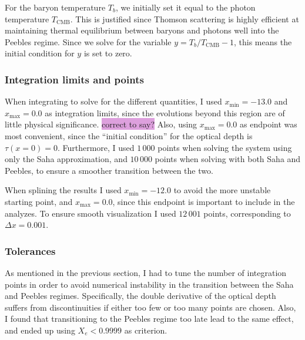 \documentclass{aa}
\numberwithin{equation}{section}
\numberwithin{table}{section}
\numberwithin{figure}{section}
\begin{document}
For the baryon temperature $T_b$, we initially set it equal to the photon temperature $T_\text{CMB}$. This is justified since Thomson scattering is highly efficient at maintaining thermal equilibrium between baryons and photons well into the Peebles regime. Since we solve for the variable $y = T_b / T_\text{CMB} - 1$, this means the initial condition for $y$ is set to zero.



\subsubsection{Integration limits and points}
When integrating to solve for the different quantities, I used $x_\text{min}=-13.0$ and $x_\text{max}=0.0$ as integration limits, since the evolutions beyond this region are of little physical significance. \colorbox{Plum}{correct to say?} Also, using $x_\text{max}=0.0$ as endpoint was most convenient, since the ``initial condition'' for the optical depth is $\tau(x=0)=0$. Furthermore, I used $1\,000$ points when solving the system using only the Saha approximation, and $10\,000$ points when solving with both Saha and Peebles, to ensure a smoother transition between the two. 

When splining the results I used $x_\text{min}=-12.0$ to avoid the more unstable starting point, and $x_\text{max}=0.0$, since this endpoint is important to include in the analyzes. To ensure smooth visualization I used $12\,001$ points, corresponding to $\Delta x = 0.001$.


\subsubsection{Tolerances}
As mentioned in the previous section, I had to tune the number of integration points in order to avoid numerical instability in the transition between the Saha and Peebles regimes. Specifically, the double derivative of the optical depth suffers from discontinuities if either too few or too many points are chosen. Also, I found that transitioning to the Peebles regime too late lead to the same effect, and ended up using $X_e<0.9999$ as criterion. 
\end{document}

